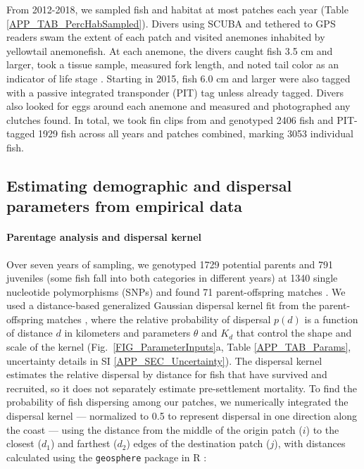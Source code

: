 \documentclass[12pt, oneside]{article}   	%
\begin{document}
From 2012-2018, we sampled fish and habitat at most patches each year (Table \ref{APP_TAB_PercHabSampled}). Divers using SCUBA and tethered to GPS readers swam the extent of each patch and visited anemones inhabited by yellowtail anemonefish. At each anemone, the divers caught fish 3.5 cm and larger, took a tissue sample, measured fork length, and noted tail color as an indicator of life stage \citep{moyer1976geographical}. Starting in 2015, fish 6.0 cm and larger were also tagged with a passive integrated transponder (PIT) tag unless already tagged. Divers also looked for eggs around each anemone and measured and photographed any clutches found. In total, we took fin clips from and genotyped 2406 fish and PIT-tagged 1929 fish across all years and patches combined, marking 3053 individual fish. %

\subsection*{Estimating demographic and dispersal parameters from empirical data} 

\paragraph*{Parentage analysis and dispersal kernel}  %

Over seven years of sampling, we genotyped 1729 potential parents and 791 juveniles (some fish fall into both categories in different years) at 1340 single nucleotide polymorphisms (SNPs) and found 71 parent-offspring matches \citep{catalanoInPrepconnectivity}. We used a distance-based generalized Gaussian dispersal kernel fit from the parent-offspring matches \citep{catalanoInPrepconnectivity, bode2018estimating}, where the relative probability of dispersal $p(d)$ is a function of distance $d$ in kilometers and parameters $\theta$ and $K_d$ that control the shape and scale of the kernel (Fig.\ \ref{FIG_ParameterInputs}a, Table \ref{APP_TAB_Params}, uncertainty details in SI \ref{APP_SEC_Uncertainty}). The dispersal kernel estimates the relative dispersal by distance for fish that have survived and recruited, so it does not separately estimate pre-settlement mortality. To find the probability of fish dispersing among our patches, we numerically integrated the dispersal kernel --- normalized to 0.5 to represent dispersal in one direction along the coast --- using the distance from the middle of the origin patch ($i$) to the closest ($d_1$) and farthest ($d_2$) edges of the destination patch ($j$), with distances calculated using the \texttt{geosphere} package in R \citep{geosphere2017R}:
\end{document}
